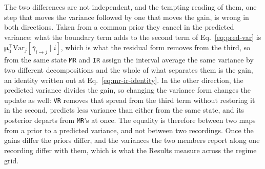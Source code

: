 \begin{appendixbox}
The two differences are not independent, and the tempting reading of them, one step that
moves the variance followed by one that moves the gain, is wrong in both directions. Taken
from a common prior they cancel in the predicted variance: what the boundary term adds to
the second term of Eq.~\ref{eq:pred-var} is
$\boldsymbol{\mu}_0^\top\mathrm{Var}_{j}[\bar{\gamma}_{i\to j}\mid i]$, which is what
the residual form removes from the third, so from the same state \texttt{MR} and \texttt{IR}
assign the interval average the same variance by two different decompositions and the whole
of what separates them is the gain, an identity written out at
Eq.~\ref{eq:mr-ir-identity}. In the other direction, the predicted
variance divides the gain, so changing the variance form changes the update as well:
\texttt{VR} removes that spread from the third term without restoring it in the second,
predicts less variance than either from the same state, and its posterior departs from
\texttt{MR}'s at once. The equality is therefore between two maps from a prior to a
predicted variance, and not between two recordings. Once the gains differ the priors differ,
and the variances the two members report along one recording differ with them, which is what
the Results measure across the regime grid.


\end{appendixbox}
